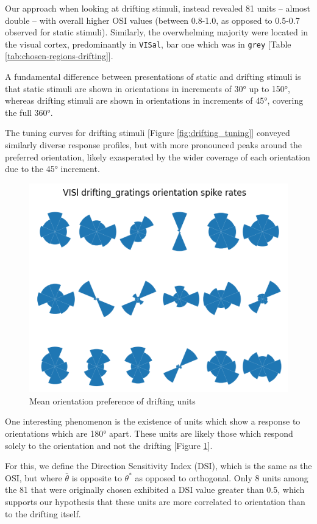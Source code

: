 \documentclass[10pt,twocolumn]{article}
\begin{document}
Our approach when looking at drifting stimuli, instead revealed 81 units -- almost double -- with overall higher OSI values (between 0.8-1.0, as opposed to 0.5-0.7 observed for static stimuli). Similarly, the overwhelming majority were located in the visual cortex, predominantly in \texttt{VISal}, bar one which was in \texttt{grey} [Table \ref{tab:chosen-regions-drifting}].

A fundamental difference between presentations of static and drifting stimuli is that static stimuli are shown in orientations in increments of 30° up to 150°, whereas drifting stimuli are shown in orientations in increments of 45°, covering the full 360°.

The tuning curves for drifting stimuli [Figure \ref{fig:drifting_tuning}] conveyed similarly diverse response profiles, but with more pronounced peaks around the preferred orientation, likely exasperated by the wider coverage of each orientation due to the 45° increment.

\begin{figure}[h]
  \centering
  \includegraphics[width=0.6\linewidth]{report_images/drifting_unit_mean_orientation.png}
  \caption{Mean orientation preference of drifting units}
  \label{fig:drifting_unit_mean_orientation}
\end{figure}

One interesting phenomenon is the existence of units which show a response to orientations which are 180° apart.  These units are likely those which respond solely to the orientation and not the drifting [Figure \ref{fig:drifting_unit_mean_orientation}].

For this, we define the Direction Sensitivity Index (DSI), which is the same as the OSI, but where \(\bar\theta\) is opposite to \(\theta^*\) as opposed to orthogonal.  Only 8 units among the 81 that were originally chosen exhibited a DSI value greater than 0.5, which supports our hypothesis that these units are more correlated to orientation than to the drifting itself.
\end{document}
